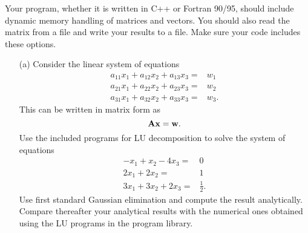 \documentclass[11pt,a4wide]{article}
\begin{document}
Your program, whether it is written in C++ or Fortran 90/95, should include
dynamic memory handling of matrices and vectors. You should also read the matrix from a file
and write your results to a file. Make sure your code includes these options.
\begin{enumerate}
\item[(a)] 
Consider the linear system of equations 
%
\begin{eqnarray}
 a_{11}x_1 +a_{12}x_2 +a_{13}x_3 =&w_1 \nonumber \\
a_{21}x_1 + a_{22}x_2 + a_{23}x_3=&w_2 \nonumber \\
a_{31}x_1 + a_{32}x_2 + a_{33}x_3=&w_3. \nonumber 
\end{eqnarray}
This can be written in matrix form as
\[
   {\bf Ax}={\bf w}.
\]
Use the included programs for LU decomposition to solve the system of equations
\begin{eqnarray}
 -x_1 +x_2 -4x_3 =&0 \nonumber \\
  2x_1 + 2x_2 =&1 \nonumber \\
3x_1 + 3x_2 + 2x_3=&\frac{1}{2}. \nonumber 
\end{eqnarray}
Use first standard Gaussian elimination and compute the result
analytically. Compare thereafter your analytical results with
the numerical ones obtained using the LU programs in the program library.


\end{enumerate}
\end{document}
